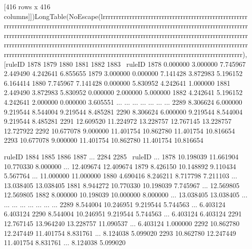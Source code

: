 [416 rows x 416 columns]])LongTable(NoEscape(lrrrrrrrrrrrrrrrrrrrrrrrrrrrrrrrrrrrrrrrrrrrrrrrrrrrrrrrrrrrrrrrrrrrrrrrrrrrrrrrrrrrrrrrrrrrrrrrrrrrrrrrrrrrrrrrrrrrrrrrrrrrrrrrrrrrrrrrrrrrrrrrrrrrrrrrrrrrrrrrrrrrrrrrrrrrrrrrrrrrrrrrrrrrrrrrrrrrrrrrrrrrrrrrrrrrrrrrrrrrrrrrrrrrrrrrrrrrrrrrrrrrrrrrrrrrrrrrrrrrrrrrrrrrrrrrrrrrrrrrrrrrrrrrrrrrrrrrrrrrrrrrrrrrrrrrrrrrrrrrrrrrrrrrrrrrrrrrrrrrrrrrrrrrrrrrrrrrrrrrrrrrrrrrrrrrrrrrrrrrrrrrrrrrrrrrrrrrrrrrrrrrrrrrrrrrrrrrr), [ruleID       1878       1879       1880       1881       1882       1883  \
ruleID                                                                     
1878     0.000000   3.000000   7.745967   2.449490   4.242641   6.855655   
1879     3.000000   0.000000   7.141428   3.872983   5.196152   6.164414   
1880     7.745967   7.141428   0.000000   5.830952   4.242641   1.000000   
1881     2.449490   3.872983   5.830952   0.000000   2.000000   5.000000   
1882     4.242641   5.196152   4.242641   2.000000   0.000000   3.605551   
...           ...        ...        ...        ...        ...        ...   
2289     8.306624   6.000000   9.219544   8.544004   9.219544   8.485281   
2290     8.306624   6.000000   9.219544   8.544004   9.219544   8.485281   
2291    12.609520  11.224972  13.228757  12.767145  13.228757  12.727922   
2292    10.677078   9.000000  11.401754  10.862780  11.401754  10.816654   
2293    10.677078   9.000000  11.401754  10.862780  11.401754  10.816654   

ruleID       1884       1885       1886       1887  ...       2284       2285  \
ruleID                                              ...                         
1878    10.198039  11.661904  10.770330   8.000000  ...  12.409674  12.409674   
1879     8.426150  10.148892   9.110434   5.567764  ...  11.000000  11.000000   
1880     4.690416   8.246211   8.717798   7.211103  ...  13.038405  13.038405   
1881     8.944272  10.770330  10.198039   7.745967  ...  12.569805  12.569805   
1882     8.000000  10.198039  10.000000   8.000000  ...  13.038405  13.038405   
...           ...        ...        ...        ...  ...        ...        ...   
2289     8.544004  10.246951   9.219544   5.744563  ...   6.403124   6.403124   
2290     8.544004  10.246951   9.219544   5.744563  ...   6.403124   6.403124   
2291    12.767145  13.964240  13.228757  11.090537  ...   6.403124   1.000000   
2292    10.862780  12.247449  11.401754   8.831761  ...   8.124038   5.099020   
2293    10.862780  12.247449  11.401754   8.831761  ...   8.124038   5.099020   

